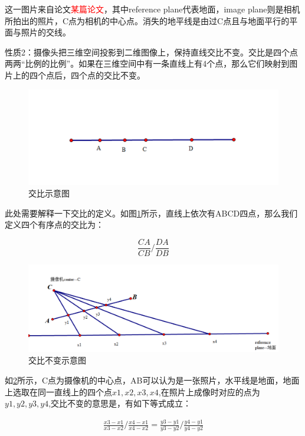 这一图片来自论文\textcolor{red}{某篇论文}，其中reference plane代表地面，image plane则是相机所拍出的照片，C点为相机的中心点。消失的地平线是由过C点且与地面平行的平面与照片的交线。

性质2：摄像头把三维空间投影到二维图像上，保持直线交比不变。交比是四个点两两“比例的比例”。如果在三维空间中有一条直线上有4个点，那么它们映射到图片上的四个点后，四个点的交比不变。

\begin{figure}[h]
    \centering
    \includegraphics[scale=0.5]{figures/交比示意.png}
    \caption{交比示意图}
    \label{fig:p7}
\end{figure}
此处需要解释一下交比的定义。如图\ref{fig:p7}所示，直线上依次有ABCD四点，那么我们定义四个有序点的交比为：

\begin{equation}
    \frac{CA}{CB}/\frac{DA}{DB}
\end{equation}

\begin{figure}[H]
    \centering
    \includegraphics[scale=0.5]{figures/交比不变示意图.png}
    \caption{交比不变示意图}
    \label{fig:p8}
\end{figure}
如\ref{fig:p8}所示，C点为摄像机的中心点，AB可以认为是一张照片，水平线是地面，地面上选取在同一直线上的四个点$x1,x2,x3,x4$,在照片上成像时对应的点为$y1,y2,y3,y4$,交比不变的意思是，有如下等式成立：

\begin{equation}
    \begin{aligned}
        \frac{x3-x1}{x3-x2}/\frac{x4-x1}{x4-x2}=\frac{y3-y1}{y3-y2}/\frac{y4-y1}{y4-y2}
    \end{aligned}
\end{equation}

